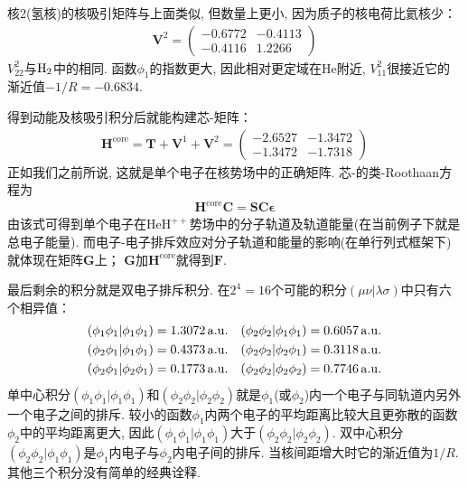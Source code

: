 核2(氢核)的核吸引矩阵与上面类似, 
但数量上更小, 
因为质子的核电荷比氦核少：
\begin{align}
	\mathbf{V}^2 = 
	\begin{pmatrix}
		-0.6772&-0.4113\\-0.4116&1.2266
	\end{pmatrix}
\end{align}
$V_{22}^2$与$\mathrm{H}_2$中的相同. 函数$\phi_1$的指数更大, 因此相对更定域在$\mathrm{He}$附近, $V_{11}^2$很接近它的渐近值$-1/R=-0.6834$.

得到动能及核吸引积分后就能构建芯-\ha 矩阵：
\begin{align}
	\mathbf{H}^\mathrm{core} = \mathbf{T+V}^1 + \mathbf{V}^2=
	\begin{pmatrix}
		-2.6527&-1.3472\\-1.3472&-1.7318
	\end{pmatrix}
\end{align}
正如我们之前所说, 
这就是单个电子在核势场中的正确\ha 矩阵. 
芯-\ha 的类-Roothaan方程为
\begin{align}
	\mathbf{H}^\mathrm{core}\mathbf{C=SC}\bm{\epsilon}
\end{align}
由该式可得到单个电子在$\mathrm{HeH}^{++}$势场中的分子轨道及轨道能量(在当前例子下就是总电子能量). 
而电子-电子排斥效应对分子轨道和能量的影响(在单行列式框架下)就体现在矩阵$\mathbf{G}$上；
$\mathbf{G}$加$\mathbf{H}^\mathrm{core}$就得到$\mathbf{F}$.


最后剩余的积分就是双电子排斥积分. 
在$2^4=16$个可能的积分$(\mu\nu|\lambda\sigma)$中只有六个相异值：
\begin{align*}
	(\phi_1\phi_1|\phi_1\phi_1)&=1.3072\,\mathrm{a.u.}& (\phi_2\phi_2|\phi_1\phi_1)&=0.6057\,\mathrm{a.u.}\\
	(\phi_2\phi_1|\phi_1\phi_1)&=0.4373\,\mathrm{a.u.}& (\phi_2\phi_2|\phi_2\phi_1)&=0.3118\,\mathrm{a.u.}\\
	(\phi_2\phi_1|\phi_2\phi_1)&=0.1773\,\mathrm{a.u.}& (\phi_2\phi_2|\phi_2\phi_2)&=0.7746\,\mathrm{a.u.}\\
\end{align*}
单中心积分$(\phi_1\phi_1|\phi_1\phi_1)$和$(\phi_2\phi_2|\phi_2\phi_2)$就是$\phi_1$(或$\phi_2$)内一个电子与同轨道内另外一个电子之间的排斥. 
较小的函数$\phi_1$内两个电子的平均距离比较大且更弥散的函数$\phi_2$中的平均距离更大, 
因此$(\phi_1\phi_1|\phi_1\phi_1)$大于$(\phi_2\phi_2|\phi_2\phi_2)$. 
双中心积分$(\phi_2\phi_2|\phi_1\phi_1)$是$\phi_1$内电子与$\phi_2$内电子间的排斥. 
当核间距增大时它的渐近值为$1/R$. 
其他三个积分没有简单的经典诠释.


